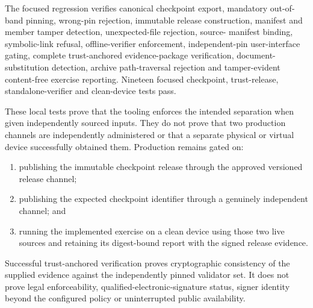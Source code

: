 The focused regression verifies canonical checkpoint export, mandatory
out-of-band pinning, wrong-pin rejection, immutable release construction,
manifest and member tamper detection, unexpected-file rejection, source-
manifest binding, symbolic-link refusal, offline-verifier enforcement,
independent-pin user-interface gating, complete trust-anchored evidence-package
verification, document-substitution detection, archive path-traversal rejection
and tamper-evident content-free exercise reporting.  Nineteen focused checkpoint,
trust-release, standalone-verifier and clean-device tests pass.

These local tests prove that the tooling enforces the intended separation when
given independently sourced inputs.  They do not prove that two production
channels are independently administered or that a separate physical or virtual
device successfully obtained them.  Production remains gated on:

\begin{enumerate}[leftmargin=*]
  \item publishing the immutable checkpoint release through the approved
        versioned release channel;
  \item publishing the expected checkpoint identifier through a genuinely
        independent channel; and
  \item running the implemented exercise on a clean device using those two live
        sources and retaining its digest-bound report with the signed release
        evidence.
\end{enumerate}

Successful trust-anchored verification proves cryptographic consistency of the
supplied evidence against the independently pinned validator set.  It does not
prove legal enforceability, qualified-electronic-signature status, signer
identity beyond the configured policy or uninterrupted public availability.
